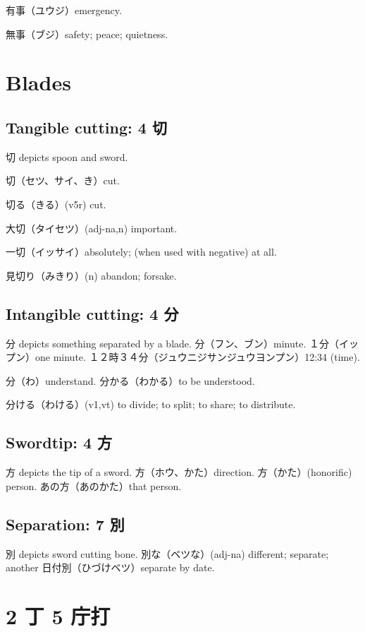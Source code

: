 有事（ユウジ）emergency.

無事（ブジ）safety; peace; quietness.

\section{Blades}

\subsection{Tangible cutting: 4 切}

切 depicts spoon and sword.

切（セツ、サイ、き）cut.

切る（きる）(v5r) cut.

大切（タイセツ）(adj-na,n) important.

一切（イッサイ）absolutely; (when used with negative) at all.

見切り（みきり）(n) abandon; forsake.

\subsection{Intangible cutting: 4 分}

分 depicts something separated by a blade.
分（フン、ブン）minute.
１分（イップン）one minute.
１２時３４分（ジュウニジサンジュウヨンプン）12:34 (time).

分（わ）understand.
分かる（わかる）to be understood.

分ける（わける）(v1,vt) to divide; to split; to share; to distribute.

\subsection{Swordtip: 4 方}

方 depicts the tip of a sword.
方（ホウ、かた）direction.
方（かた）(honorific) person.
あの方（あのかた）that person.

\subsection{Separation: 7 別}

別 depicts sword cutting bone.
別な（ベツな）(adj-na) different; separate; another
日付別（ひづけベツ）separate by date.

\section{2 丁 5 庁打}

